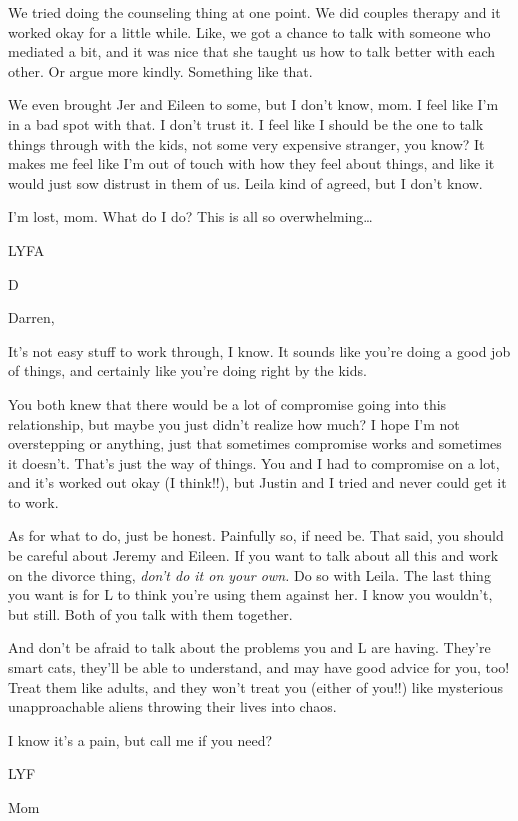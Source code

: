 We tried doing the counseling thing at one point. We did couples therapy and it worked okay for a little while. Like, we got a chance to talk with someone who mediated a bit, and it was nice that she taught us how to talk better with each other. Or argue more kindly. Something like that.

We even brought Jer and Eileen to some, but I don't know, mom. I feel like I'm in a bad spot with that. I don't trust it. I feel like I should be the one to talk things through with the kids, not some very expensive stranger, you know? It makes me feel like I'm out of touch with how they feel about things, and like it would just sow distrust in them of us. Leila kind of agreed, but I don't know.

I'm lost, mom. What do I do? This is all so overwhelming\ldots{}

LYFA

D

\secdiv{}

Darren,

It's not easy stuff to work through, I know. It sounds like you're doing a good job of things, and certainly like you're doing right by the kids.

You both knew that there would be a lot of compromise going into this relationship, but maybe you just didn't realize how much? I hope I'm not overstepping or anything, just that sometimes compromise works and sometimes it doesn't. That's just the way of things. You and I had to compromise on a lot, and it's worked out okay (I think!!), but Justin and I tried and never could get it to work.

As for what to do, just be honest. Painfully so, if need be. That said, you should be careful about Jeremy and Eileen. If you want to talk about all this and work on the divorce thing, \emph{don't do it on your own.} Do so with Leila. The last thing you want is for L to think you're using them against her. I know you wouldn't, but still. Both of you talk with them together.

And don't be afraid to talk about the problems you and L are having. They're smart cats, they'll be able to understand, and may have good advice for you, too! Treat them like adults, and they won't treat you (either of you!!) like mysterious unapproachable aliens throwing their lives into chaos.

I know it's a pain, but call me if you need?

LYF

Mom

